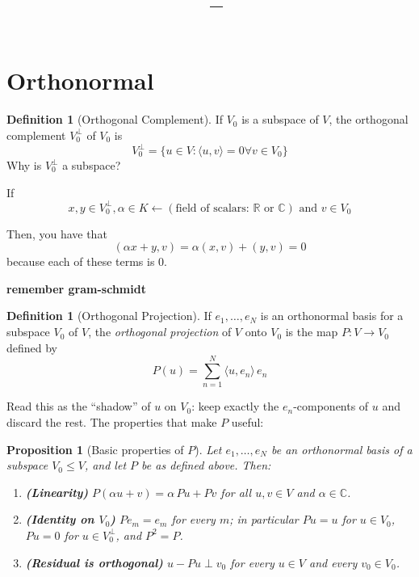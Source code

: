 \documentclass[11pt]{article}
\title{\vspace{-1.5em}\textbf{\coursename\ -- \lecturetitle}}
\author{\studentname}
\date{\lecturedate}
\newcommand{\1}{\mathbf{1}}
\theoremstyle{notestyle}
\newtheorem{proposition}[theorem]{Proposition}
\theoremstyle{definition}
\newtheorem{definition}[theorem]{Definition}
\begin{document}
\maketitle

\section{Orthonormal}
\begin{definition}[Orthogonal Complement]
\label{def:label}
If $V_0$ is a subspace of $V$, the orthogonal complement $V_0^{\perp}$ of $V_0$ is
$$V_0^{\perp} = \{u \in V : \langle u, v\rangle = 0 \forall v \in V_0\}$$
Why is $V_0^{\perp}$ a subspace?
\par If $$x, y \in V_0^{\perp}, \alpha \in K \leftarrow (\text{field of scalars: } 
\mathbb{R} \text{ or } \mathbb{C}) \text{ and } v \in V_0$$
\end{definition}
Then, you have that $$(\alpha x + y, v) = \alpha (x, v) + (y, v) = 0$$ because each of
these terms is 0.
\par \textbf{remember gram-schmidt}
\begin{definition}[Orthogonal Projection]
\label{def:orthogonal-projection}
If $e_1, \dots, e_N$ is an orthonormal basis for a subspace $V_0$ of $V$, the
\emph{orthogonal projection} of $V$ onto $V_0$ is the map $P : V \rightarrow V_0$
defined by
$$P(u) = \sum_{n=1}^{N} \langle u, e_n \rangle\, e_n$$
\end{definition}
\par Read this as the ``shadow'' of $u$ on $V_0$: keep exactly the $e_n$-components
of $u$ and discard the rest. The properties that make $P$ useful:
\begin{proposition}[Basic properties of $P$]
\label{prop:projection-basics}
Let $e_1, \dots, e_N$ be an orthonormal basis of a subspace $V_0 \le V$, and let
$P$ be as defined above. Then:
\begin{enumerate}
    \item \textbf{(Linearity)} $P(\alpha u + v) = \alpha\, Pu + Pv$ for all
    $u, v \in V$ and $\alpha \in \mathbb{C}$.
    \item \textbf{(Identity on $V_0$)} $Pe_m = e_m$ for every $m$; in particular
    $Pu = u$ for $u \in V_0$, $Pu = 0$ for $u \in V_0^{\perp}$, and $P^2 = P$.
    \item \textbf{(Residual is orthogonal)} $u - Pu \perp v_0$ for every $u \in V$
    and every $v_0 \in V_0$.
\end{enumerate}
\end{proposition}
\end{document}
